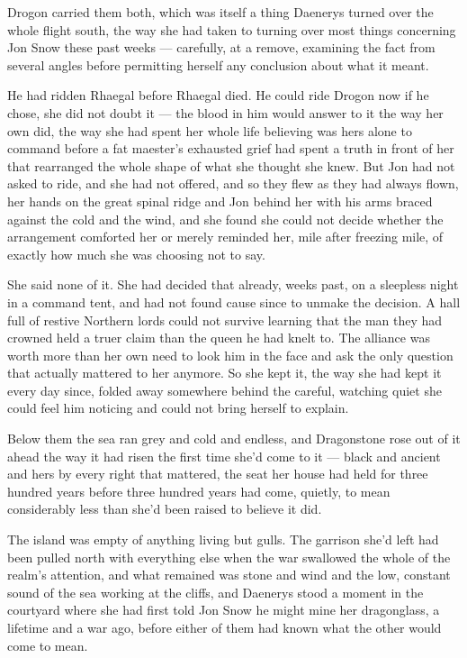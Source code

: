 Drogon carried them both, which was itself a thing Daenerys turned over the whole flight south, the way she had taken to turning over most things concerning Jon Snow these past weeks — carefully, at a remove, examining the fact from several angles before permitting herself any conclusion about what it meant.

He had ridden Rhaegal before Rhaegal died. He could ride Drogon now if he chose, she did not doubt it — the blood in him would answer to it the way her own did, the way she had spent her whole life believing was hers alone to command before a fat maester’s exhausted grief had spent a truth in front of her that rearranged the whole shape of what she thought she knew. But Jon had not asked to ride, and she had not offered, and so they flew as they had always flown, her hands on the great spinal ridge and Jon behind her with his arms braced against the cold and the wind, and she found she could not decide whether the arrangement comforted her or merely reminded her, mile after freezing mile, of exactly how much she was choosing not to say.

She said none of it. She had decided that already, weeks past, on a sleepless night in a command tent, and had not found cause since to unmake the decision. A hall full of restive Northern lords could not survive learning that the man they had crowned held a truer claim than the queen he had knelt to. The alliance was worth more than her own need to look him in the face and ask the only question that actually mattered to her anymore. So she kept it, the way she had kept it every day since, folded away somewhere behind the careful, watching quiet she could feel him noticing and could not bring herself to explain.

Below them the sea ran grey and cold and endless, and Dragonstone rose out of it ahead the way it had risen the first time she’d come to it — black and ancient and hers by every right that mattered, the seat her house had held for three hundred years before three hundred years had come, quietly, to mean considerably less than she’d been raised to believe it did.

\sceneBreak

The island was empty of anything living but gulls. The garrison she’d left had been pulled north with everything else when the war swallowed the whole of the realm’s attention, and what remained was stone and wind and the low, constant sound of the sea working at the cliffs, and Daenerys stood a moment in the courtyard where she had first told Jon Snow he might mine her dragonglass, a lifetime and a war ago, before either of them had known what the other would come to mean.

